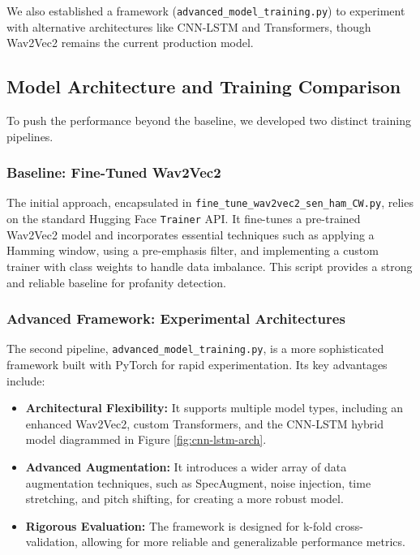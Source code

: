 \documentclass{article}
\begin{document}
We also established a framework (\texttt{advanced\_model\_training.py}) to experiment with alternative architectures like CNN-LSTM and Transformers, though Wav2Vec2 remains the current production model.

\subsection{Model Architecture and Training Comparison}

To push the performance beyond the baseline, we developed two distinct training pipelines.

\subsubsection{Baseline: Fine-Tuned Wav2Vec2}
The initial approach, encapsulated in \texttt{fine\_tune\_wav2vec2\_sen\_ham\_CW.py}, relies on the standard Hugging Face \texttt{Trainer} API. It fine-tunes a pre-trained Wav2Vec2 model and incorporates essential techniques such as applying a Hamming window, using a pre-emphasis filter, and implementing a custom trainer with class weights to handle data imbalance. This script provides a strong and reliable baseline for profanity detection.

\subsubsection{Advanced Framework: Experimental Architectures}
The second pipeline, \texttt{advanced\_model\_training.py}, is a more sophisticated framework built with PyTorch for rapid experimentation. Its key advantages include:
\begin{itemize}
    \item \textbf{Architectural Flexibility:} It supports multiple model types, including an enhanced Wav2Vec2, custom Transformers, and the CNN-LSTM hybrid model diagrammed in Figure \ref{fig:cnn-lstm-arch}.
    \item \textbf{Advanced Augmentation:} It introduces a wider array of data augmentation techniques, such as SpecAugment, noise injection, time stretching, and pitch shifting, for creating a more robust model.
    \item \textbf{Rigorous Evaluation:} The framework is designed for k-fold cross-validation, allowing for more reliable and generalizable performance metrics.
\end{itemize}
\end{document}
